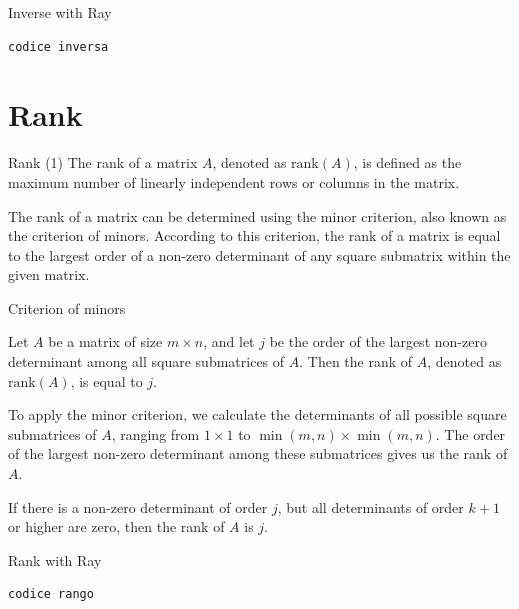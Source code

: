\documentclass{beamer}
\begin{document}
\begin{frame}[fragile]{Inverse with Ray}
    \begin{lstlisting}[language=Python]
            codice inversa
        \end{lstlisting}
\end{frame}

\section{Rank}
\begin{frame}{Rank (1)}
    The \alert{rank} of a matrix $A$, denoted as $\text{rank}(A)$, is defined as the maximum number of linearly independent rows or columns in the matrix.

    The rank of a matrix can be determined using the minor criterion, also known as the \alert{criterion of minors}. According to this criterion, the rank of a matrix is equal to the largest order of a non-zero determinant of any square submatrix within the given matrix.
\end{frame}

\begin{frame}{Criterion of minors}

    Let $A$ be a matrix of size $m \times n$, and let $j$ be the order of the largest non-zero determinant among all square submatrices of $A$. Then the rank of $A$, denoted as $\text{rank}(A)$, is equal to $j$.

    To apply the minor criterion, we calculate the determinants of all possible square submatrices of $A$, ranging from $1 \times 1$ to $\min(m,n) \times \min(m,n)$. The order of the largest non-zero determinant among these submatrices gives us the rank of $A$.

    If there is a non-zero determinant of order $j$, but all determinants of order $k+1$ or higher are zero, then the rank of $A$ is $j$.
\end{frame}

\begin{frame}[fragile]{Rank with Ray}
    \begin{lstlisting}[language=Python]
            codice rango
        \end{lstlisting}
\end{frame}
\end{document}
